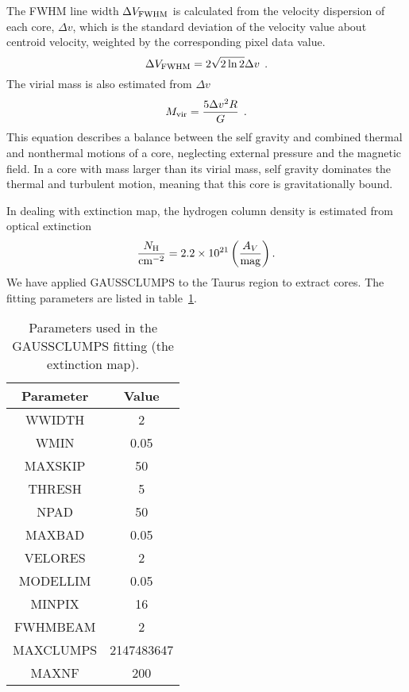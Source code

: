 \documentclass[12pt,preprint]{aastex}
\def\lp{\>\> .}
\begin{document}
The FWHM line width $\Delta V_{\rm FWHM}$ is calculated from the velocity
dispersion of each core, $\Delta v$, which is the standard deviation of the velocity value about centroid velocity, weighted
by the corresponding pixel data value.
\begin{equation}
{\Delta V_{\rm FWHM}}=2\sqrt{2\ln 2}\Delta v \lp
\end{equation}
The virial mass is also estimated from $\Delta v$ \citep{Pressure_confine}
\begin{equation}
M_{\rm vir}=\frac{5\Delta v^2 R}{G}\lp
\label{virial_mass}
\end{equation}
This equation describes a balance between the self gravity and combined thermal and
nonthermal motions of a core, neglecting external pressure and the magnetic field.
In a core with mass larger than its virial mass, self gravity dominates the thermal and turbulent motion, meaning that
this core is gravitationally bound.


In dealing with extinction map, the hydrogen column density is estimated from optical extinction \citep{extinction_column}
\begin{equation}
\frac{N_{\rm H}}{\rm cm^{-2}}=2.2\times 10^{21} \left(\frac{A_V}{\rm mag}\right).
\end{equation}
We have applied GAUSSCLUMPS to the Taurus
region to extract cores. The fitting parameters are listed in
table~\ref{extinctionpara}.

\begin{table}[htb]
\begin{center}
\caption{Parameters used in the GAUSSCLUMPS fitting (the extinction map).\label{extinctionpara}}
\begin{tabular}{|c|c|}
\hline \hline  Parameter & Value \\
\hline
WWIDTH      & 2  \\\hline
WMIN        & 0.05  \\\hline
MAXSKIP     & 50  \\\hline
THRESH      & 5  \\\hline
NPAD        & 50  \\\hline
MAXBAD      & 0.05  \\\hline
VELORES     & 2  \\\hline
MODELLIM    & 0.05  \\\hline
MINPIX      & 16  \\\hline
FWHMBEAM    & 2  \\\hline
MAXCLUMPS   & 2147483647  \\\hline
MAXNF       & 200  \\\hline
\hline
\end{tabular}
\end{center}
\end{table}
\end{document}
